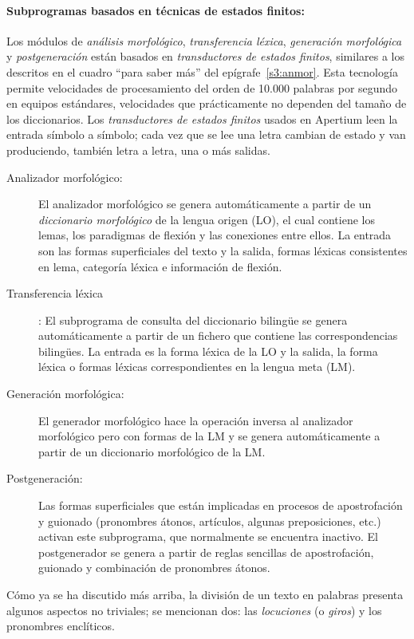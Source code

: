 \paragraph{Subprogramas basados en técnicas de estados finitos:} Los módulos de \emph{análisis morfológico}, \emph{transferencia léxica}, \emph{generación morfológica} y {\em postgeneración} están basados en \emph{transductores de estados finitos}, similares a los descritos en el cuadro ``para saber más'' del epígrafe~\ref{s3:anmor}. Esta tecnología permite velocidades de procesamiento del orden de 10.000 palabras por segundo en equipos estándares, velocidades que prácticamente no dependen del tamaño de los diccionarios. Los \emph{transductores de estados finitos} usados en Apertium leen la entrada símbolo a símbolo; cada vez que se lee una letra cambian de estado y van produciendo, también letra a letra, una o más salidas. \begin{description} \item[Analizador morfológico:] El analizador morfológico se genera automáticamente a partir de un \emph{diccionario morfológico} de la lengua origen (LO), el cual contiene los lemas, los paradigmas de flexión y las conexiones entre ellos. La entrada son las formas superficiales del texto y la salida, formas léxicas consistentes en lema, categoría léxica e información de flexión. \item[Transferencia léxica]: El subprograma de consulta del diccionario bilingüe se genera automáticamente a partir de un fichero que contiene las correspondencias bilingües. La entrada es la forma léxica de la LO y la salida, la forma léxica o formas léxicas correspondientes en la lengua meta (LM). \item[Generación morfológica:] El generador morfológico hace la operación inversa al analizador morfológico pero con formas de la LM y se genera automáticamente a partir de un diccionario morfológico de la LM. \item[Postgeneración:] Las formas superficiales que están implicadas en procesos de apostrofación y guionado (pronombres átonos, artículos, algunas preposiciones, etc.) activan este subprograma, que normalmente se encuentra inactivo. El postgenerador se genera a partir de reglas sencillas de apostrofación, guionado y combinación de pronombres átonos. \end{description} Cómo ya se ha discutido más arriba, la división de un texto en palabras presenta algunos aspectos no triviales; se mencionan dos: las \emph{locuciones} (o \emph{giros}) y los pronombres enclíticos. 

